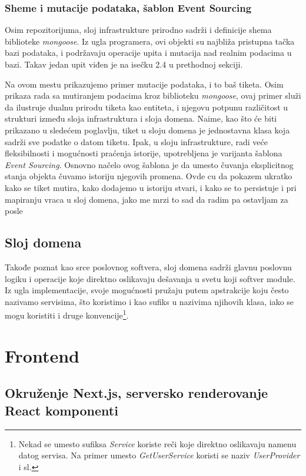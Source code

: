 \documentclass[12pt,oneside]{memoir}
\begin{document}
\newpage
\subsection{Sheme i mutacije podataka, šablon Event Sourcing}
Osim repozitorijuma, sloj infrastrukture prirodno sadrži i definicije shema biblioteke \textit{mongoose}. Iz ugla programera, ovi objekti su najbliža pristupna tačka bazi podataka, i podržavaju operacije upita i mutacija nad realnim podacima u bazi. Takav jedan upit viđen je na isečku 2.4 u prethodnoj sekciji.

Na ovom mestu prikazujemo primer mutacije podataka, i to baš tiketa. Osim prikaza rada sa mutiranjem podacima kroz biblioteku \textit{mongoose}, ovaj primer služi da ilustruje dualnu prirodu tiketa kao entiteta, i njegovu potpunu različitost u strukturi između sloja infrastruktura i sloja domena. Naime, kao što će biti prikazano u sledećem poglavlju, tiket u sloju domena je jednostavna klasa koja sadrži sve podatke o datom tiketu. Ipak, u sloju infrastrukture, radi veće fleksibilnosti i mogućnosti praćenja istorije, upotrebljena je varijanta šablona \textit{Event Sourcing}. Osnovno načelo ovog šablona je da umesto čuvanja eksplicitnog stanja objekta čuvamo istoriju njegovih promena.
Ovde cu da pokazem ukratko kako se tiket mutira, kako dodajemo u istoriju stvari, i kako se to persistuje i pri mapiranju vraca u sloj domena, jako me mrzi to sad da radim pa ostavljam za posle


\newpage
\section{Sloj domena}

Takođe poznat kao srce poslovnog softvera, sloj domena sadrži glavnu poslovnu logiku i operacije koje direktno oslikavaju dešavanja u svetu koji softver module. Iz ugla implementacije, svoje mogućnosti pružaju putem apstrakcije koju često nazivamo servisima, što koristimo i kao sufiks u nazivima njihovih klasa, iako se mogu koristiti i druge konvencije\footnote{Nekad se umesto sufiksa \textit{Service} koriste reči koje direktno oslikavaju namenu datog servisa. Na primer umesto \textit{GetUserService} koristi se naziv \textit{UserProvider} i sl.}.

\chapter{Frontend}
\section{Okruženje Next.js, serversko renderovanje React komponenti}
\end{document}
